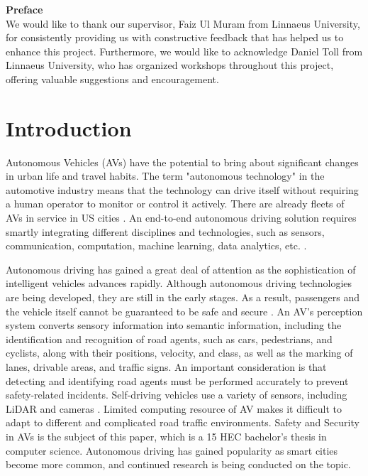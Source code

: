 \documentclass[a4paper,12pt]{article}
\begin{document}
\textbf {\large{Preface}}\\

\noindent We would like to thank our supervisor, Faiz Ul Muram from Linnaeus University, for consistently providing us with constructive feedback that has helped us to enhance this project. Furthermore, we would like to acknowledge Daniel Toll from Linnaeus University, who has organized workshops throughout this project, offering valuable suggestions and encouragement.

\newpage
{}
\tableofcontents %
\newpage
{}


%

\newpage

\section{Introduction}
\label{sec:Introduction}

\hspace{5mm} Autonomous Vehicles (AVs) have the potential to bring about significant changes in urban life and travel habits. The term "autonomous technology" in the automotive industry means that the technology can drive itself without requiring a human operator to monitor or control it actively. There are already fleets of AVs in service in US cities \cite{article2}. An end-to-end autonomous driving solution requires smartly integrating different disciplines and technologies, such as sensors, communication, computation, machine learning, data analytics, etc. \cite {article3}.


Autonomous driving has gained a great deal of attention as the sophistication of intelligent vehicles advances rapidly. Although autonomous driving technologies are being developed, they are still in the early stages. As a result, passengers and the vehicle itself cannot be guaranteed to be safe and secure \cite{article1}. An AV’s perception system converts sensory information into semantic information, including the identification and recognition of road agents, such as cars, pedestrians, and cyclists, along with their positions, velocity, and class, as well as the marking of lanes, drivable areas, and traffic signs. An important consideration is that detecting and identifying road agents must be performed accurately to prevent safety-related incidents. Self-driving vehicles use a variety of sensors, including LiDAR and cameras \cite{article4}. Limited computing resource of AV makes it difficult to adapt to different and complicated road traffic environments. Safety and Security in AVs is the subject of this paper, which is a 15 HEC bachelor’s thesis in computer science. Autonomous driving has gained popularity as smart cities become more common, and continued research is being conducted on the topic.
\end{document}
